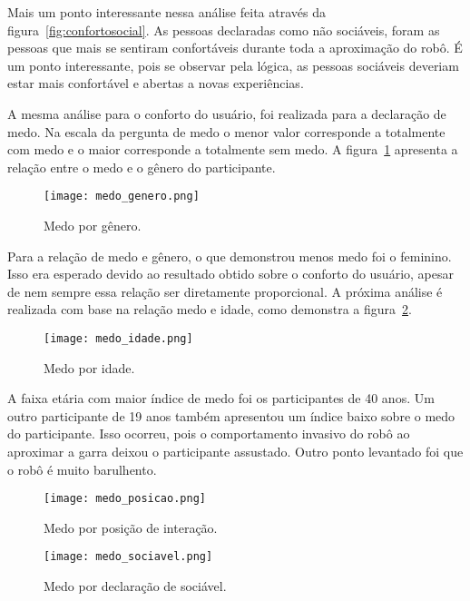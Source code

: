 Mais um ponto interessante nessa análise feita através da figura~\ref{fig:confortosocial}. As pessoas declaradas como não sociáveis, foram as pessoas que mais se sentiram confortáveis durante toda a aproximação do robô. É um ponto interessante, pois se observar pela lógica, as pessoas sociáveis deveriam estar mais confortável e abertas a novas experiências.

A mesma análise para o conforto do usuário, foi realizada para a declaração de medo. Na escala da pergunta de medo o menor valor corresponde a totalmente com medo e o maior corresponde a totalmente sem medo. A figura~\ref{fig:medogenero} apresenta a relação entre o medo e o gênero do participante.

\begin{figure}[ht!]
	\centering
	\begin{minipage}{0.65\textwidth}
		\caption{Medo por gênero.}
		\texttt{[image: medo\_genero.png]}
		\label{fig:medogenero}
	\end{minipage}
\end{figure}

Para a relação de medo e gênero, o que demonstrou menos medo foi o feminino. Isso era esperado devido ao resultado obtido sobre o conforto do usuário, apesar de nem sempre essa relação ser diretamente proporcional. A próxima análise é realizada com base na relação medo e idade, como demonstra a figura~\ref{fig:medoidade}.

\begin{figure}[ht!]
	\centering
	\begin{minipage}{0.65\textwidth}
		\caption{Medo por idade.}
		\texttt{[image: medo\_idade.png]}
		\label{fig:medoidade}
	\end{minipage}
\end{figure}

A faixa etária com maior índice de medo foi os participantes de 40 anos. Um outro participante de 19 anos também apresentou um índice baixo sobre o medo do participante. Isso ocorreu, pois o comportamento invasivo do robô ao aproximar a garra deixou o participante assustado. Outro ponto levantado foi que o robô é muito barulhento.

\begin{figure}[ht!]
	\centering
	\begin{minipage}{0.65\textwidth}
		\caption{Medo por posição de interação.}
		\texttt{[image: medo\_posicao.png]}
		\label{fig:medoposicao}
	\end{minipage}
\end{figure}

\begin{figure}[ht!]
	\centering
	\begin{minipage}{0.65\textwidth}
		\caption{Medo por declaração de sociável.}
		\texttt{[image: medo\_sociavel.png]}
		\label{fig:medosociavel}
	\end{minipage}
\end{figure}
